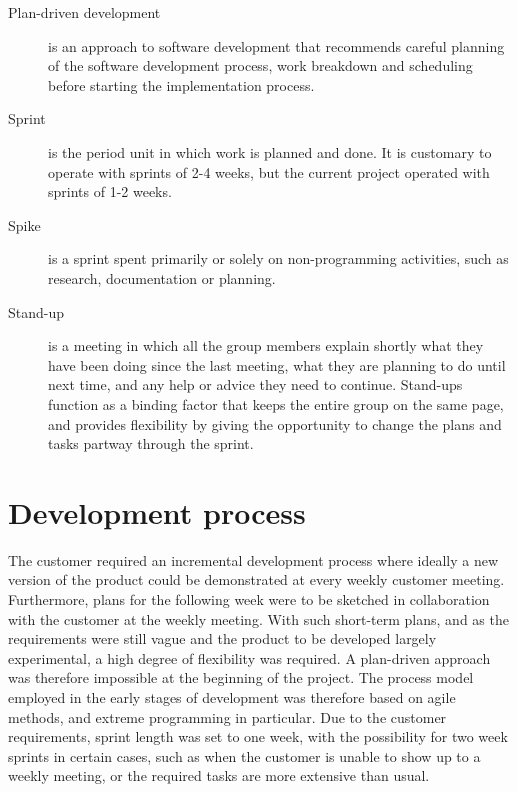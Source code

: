 \begin{description}
\item[Plan-driven development] \label{def:plan-driven} is an approach to software development that recommends careful planning of the software development process, work breakdown and scheduling before starting the implementation process. 

\item[Sprint] \label{def:sprint} is the period unit in which work is planned and done. It is customary to operate with sprints of 2-4 weeks, but the current project operated with sprints of 1-2 weeks.

\item[Spike] \label{def:spike} is a sprint spent primarily or solely on non-programming activities, such as research, documentation or planning.

\item[Stand-up] \label{def:dailyScrum} is a meeting in which all the group members explain shortly what they have been doing since the last meeting, what they are planning to do until next time, and any help or advice they need to continue. Stand-ups function as a binding factor that keeps the entire group on the same page, and provides flexibility by giving the opportunity to change the plans and tasks partway through the sprint.

\end{description}

\section{Development process}
\label{def:devProcess}
The customer required an incremental development process where ideally a new version of the product could be demonstrated at every weekly customer meeting. Furthermore, plans for the following week were to be sketched in collaboration with the customer at the weekly meeting. With such short-term plans, and as the requirements were still vague and the product to be developed largely experimental, a high degree of flexibility was required. A plan-driven approach was therefore impossible at the beginning of the project. The process model employed in the early stages of development was therefore based on agile methods, and extreme programming in particular. Due to the customer requirements, sprint length was set to one week, with the possibility for two week sprints in certain cases, such as when the customer is unable to show up to a weekly meeting, or the required tasks are more extensive than usual. 


